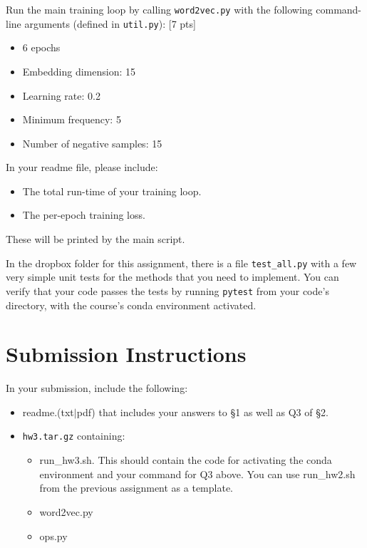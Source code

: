 \documentclass[11pt]{article}
\begin{document}
\vspace{2em}
 Run the main training loop by calling \texttt{word2vec.py} with the following command-line arguments (defined in \texttt{util.py}): [7 pts]
\begin{itemize}
  \item 6 epochs
  \item Embedding dimension: 15
  \item Learning rate: 0.2
  \item Minimum frequency: 5
  \item Number of negative samples: 15
\end{itemize}
In your readme file, please include: 
\begin{itemize}
  \item The total run-time of your training loop.  
  \item The per-epoch training loss. 
\end{itemize}
These will be printed by the main script.


\vspace{2em}
 In the dropbox folder for this assignment, there is a file \texttt{test\_all.py} with a few very simple unit tests for the methods that you need to implement.  You can verify that your code passes the tests by running \texttt{pytest} from your code's directory, with the course's conda environment activated.


\section*{Submission Instructions}

In your submission, include the following:
\begin{itemize}
  \item readme.(txt$\mid$pdf) that includes your answers to \S1 as well as Q3 of \S2. 
  \item \texttt{hw3.tar.gz} containing:
  \begin{itemize}
    \item run\_hw3.sh.  This should contain the code for activating the conda environment and your command for Q3 above.  You can use run\_hw2.sh from the previous assignment as a template.
    \item word2vec.py
    \item ops.py
  \end{itemize}
\end{itemize}
\end{document}
